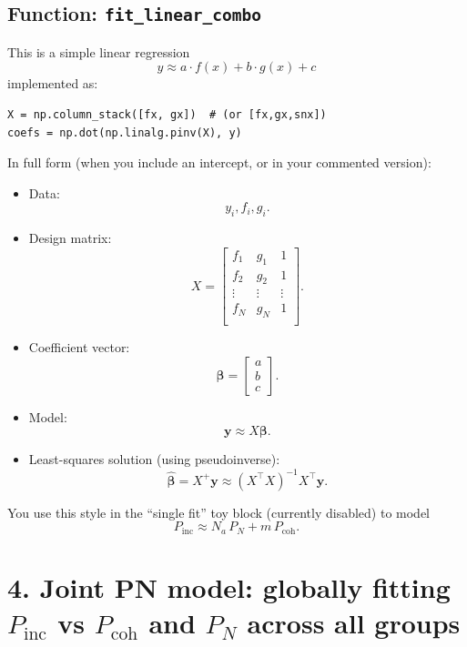 \documentclass[11pt]{article}
\begin{document}
\subsection*{Function: \texttt{fit\_linear\_combo}}

This is a simple linear regression
\[
  y \approx a \cdot f(x) + b \cdot g(x) + c
\]
implemented as:

\begin{verbatim}
X = np.column_stack([fx, gx])  # (or [fx,gx,snx])
coefs = np.dot(np.linalg.pinv(X), y)
\end{verbatim}

In full form (when you include an intercept, or in your commented version):

\begin{itemize}[leftmargin=*]
  \item Data:
  \[
    y_i, f_i, g_i.
  \]

  \item Design matrix:
  \[
    X =
    \begin{bmatrix}
      f_1 & g_1 & 1 \\
      f_2 & g_2 & 1 \\
      \vdots & \vdots & \vdots \\
      f_N & g_N & 1 \\
    \end{bmatrix}.
  \]

  \item Coefficient vector:
  \[
    \boldsymbol{\beta} =
    \begin{bmatrix}
      a \\ b \\ c
    \end{bmatrix}.
  \]

  \item Model:
  \[
    \mathbf{y} \approx X \boldsymbol{\beta}.
  \]

  \item Least-squares solution (using pseudoinverse):
  \[
    \hat{\boldsymbol{\beta}} = X^+ \mathbf{y}
    \approx (X^\top X)^{-1} X^\top \mathbf{y}.
  \]
\end{itemize}

You use this style in the ``single fit'' toy block (currently disabled) to model
\[
  P_{\mathrm{inc}} \approx N_a\, P_N + m\, P_{\mathrm{coh}}.
\]

\section*{4. Joint PN model: globally fitting \texorpdfstring{$P_{\mathrm{inc}}$}{P\_inc} vs \texorpdfstring{$P_{\mathrm{coh}}$}{P\_coh} and \texorpdfstring{$P_N$}{P\_N} across all groups}
\end{document}
